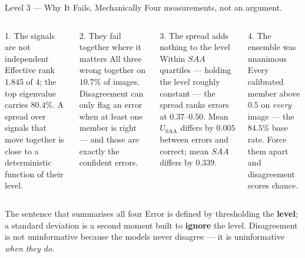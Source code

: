 \documentclass[aspectratio=169,11pt]{beamer}
\begin{document}
\begin{frame}{Level 3 --- Why It Fails, Mechanically}
\small
Four measurements, not an argument.
\vspace{1mm}
\begin{columns}[T]
\begin{block}{\small 1. The signals are not independent}
\scriptsize Effective rank $\mathbf{1.845}$ of $4$; the top eigenvalue carries $80.4\%$. A spread over signals that move together is close to a deterministic function of their level.
\end{block}
\begin{block}{\small 2. They fail together where it matters}
\scriptsize All three wrong together on $10.7\%$ of images. Disagreement can only flag an error when at least one member is right --- and those are exactly the confident errors.
\end{block}

\begin{block}{\small 3. The spread adds nothing to the level}
\scriptsize Within $SAA$ quartiles --- holding the level roughly constant --- the spread ranks errors at $0.37$--$0.50$. Mean $U_{\text{SAA}}$ differs by $\mathbf{0.005}$ between errors and correct; mean $SAA$ differs by $\mathbf{0.339}$.
\end{block}
\begin{block}{\small 4. The ensemble was unanimous}
\scriptsize Every calibrated member above $0.5$ on \emph{every} image --- the $84.5\%$ base rate. Force them apart and disagreement scores chance.
\end{block}
\end{columns}
\vspace{1mm}
\begin{alertblock}{\small The sentence that summarises all four}
\footnotesize Error is defined by thresholding the \textbf{level}; a standard deviation is a second moment built to \textbf{ignore} the level. Disagreement is not uninformative because the models never disagree --- it is uninformative \emph{when they do}.
\end{alertblock}
\end{frame}
\end{document}
